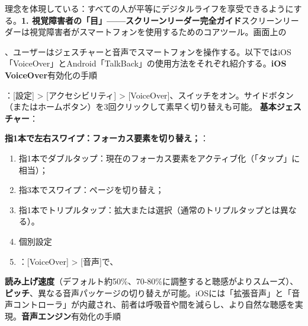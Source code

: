 
理念を体現している：すべての人が平等にデジタルライフを享受できるようにする。\textbf{1. 視覚障害者の「目」——スクリーンリーダー完全ガイド}スクリーンリーダーは視覚障害者がスマートフォンを使用するためのコアツール。画面上の


、ユーザーはジェスチャーと音声でスマートフォンを操作する。以下ではiOS「VoiceOver」とAndroid「TalkBack」の使用方法をそれぞれ紹介する。\textbf{iOS VoiceOver}有効化の手順

\begin{tcbinfo}{：[設定] > [アクセシビリティ] > [VoiceOver]、スイッチをオン。サイドボタン（またはホームボタン）を3回クリックして素早く切り替えも可能。}
\textbf{基本ジェスチャー}：

\textbf{指1本で左右スワイプ：フォーカス要素を切り替え；}：

\begin{enumerate}
  \item 指1本でダブルタップ：現在のフォーカス要素をアクティブ化（「タップ」に相当）；
  \item 指3本でスワイプ：ページを切り替え；
  \item 指1本でトリプルタップ：拡大または選択（通常のトリプルタップとは異なる）。
  \item 個別設定
  \item ：[VoiceOver] > [音声]で、
\end{enumerate}

\textbf{読み上げ速度}（デフォルト約50\%、70-80\%に調整すると聴感がよりスムーズ）、\textbf{ピッチ}、異なる音声パッケージの切り替えが可能。iOSには「拡張音声」と「音声コントローラ」が内蔵され、前者は呼吸音や間を減らし、より自然な聴感を実現。\textbf{音声エンジン}有効化の手順

\end{tcbinfo}

